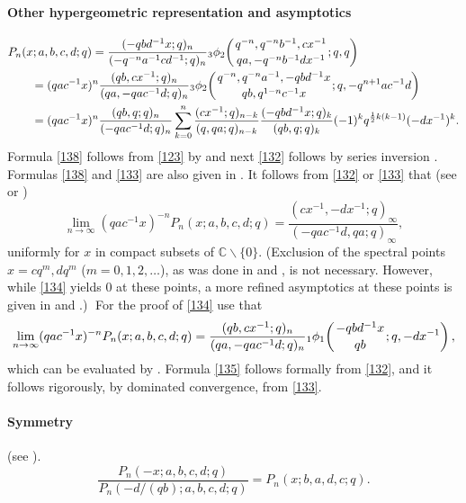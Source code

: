 \documentclass[twoside,11pt]{article}
\newcommand\CC{\mathbb{C}}
\newcommand\half{\frac12}
\newcommand\iy\infty
\newcommand{\qhypK}[5]{ \mbox{}_{#1}\phi_{#2}\!\left(
  \genfrac{}{}{0pt}{}{#3}{#4};#5\right)}
\begin{document}
\paragraph{Other hypergeometric representation and asymptotics}
\begin{align}
&P_n(x;a,b,c,d;q)
=\frac{(-qbd^{-1}x;q)_n}{(-q^{-n}a^{-1}cd^{-1};q)_n} 
\qhypK32{q^{-n},q^{-n}b^{-1},cx^{-1}}{qa,-q^{-n}b^{-1}dx^{-1}}{q,q}
\label{138}\\
&\qquad=(qac^{-1}x)^n \frac{(qb,cx^{-1};q)_n}{(qa,-qac^{-1}d;q)_n} 
\qhypK32{q^{-n},q^{-n}a^{-1},-qbd^{-1}x}{qb,q^{1-n}c^{-1}x}
{q,-q^{n+1}ac^{-1}d}
\label{132}\\
&\qquad=(qac^{-1}x)^n \frac{(qb,q;q)_n}{(-qac^{-1}d;q)_n} 
\sum_{k=0}^n\frac{(cx^{-1};q)_{n-k}}{(q,qa;q)_{n-k}} 
\frac{(-qbd^{-1}x;q)_k}{(qb,q;q)_k} (-1)^k q^{\half k(k-1)}(-dx^{-1})^k.
\label{133}
\end{align}
Formula \eqref{138} follows from \eqref{123} by
 and next \eqref{132} follows by series inversion
.
Formulas \eqref{138} and \eqref{133} are also given in
.
It follows from \eqref{132} or \eqref{133} that
(see  or )
\begin{equation}
\lim_{n\to\iy}(qac^{-1}x)^{-n} P_n(x;a,b,c,d;q)
=\frac{(cx^{-1},-dx^{-1};q)_\iy}{(-qac^{-1}d,qa;q)_\iy} ,
\label{134}
\end{equation}
uniformly for $x$ in compact subsets of $\CC\backslash\{0\}$.
(Exclusion of the spectral points $x=cq^m,dq^m$ ($m=0,1,2,\ldots$),
as was done in  and , is not necessary. However,
while \eqref{134} yields 0 at these points, a more refined asymptotics
at these points is given in  and .)$\;$
For the proof of \eqref{134} use that
\begin{equation}
\lim_{n\to\iy}(qac^{-1}x)^{-n} P_n(x;a,b,c,d;q)
=\frac{(qb,cx^{-1};q)_n}{(qa,-qac^{-1}d;q)_n} 
\qhypK11{-qbd^{-1}x}{qb}{q,-dx^{-1}},
\label{135}
\end{equation}
which can be evaluated by .
Formula \eqref{135} follows formally from \eqref{132}, and it follows rigorously, by
dominated convergence, from \eqref{133}.
%
\paragraph{Symmetry}
(see \cite[\S2.5]{K17}).
\begin{equation}
\frac{P_n(-x;a,b,c,d;q)}{P_n(-d/(qb);a,b,c,d;q)}
=P_n(x;b,a,d,c;q).
\end{equation}
%
\end{document}
